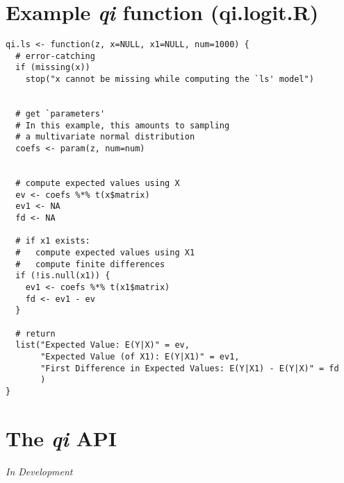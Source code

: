 \documentclass[10pt]{article}
\begin{document}
\pagebreak


\section{Example \emph{qi} function (qi.logit.R)}


\begin{verbatim}
qi.ls <- function(z, x=NULL, x1=NULL, num=1000) {
  # error-catching
  if (missing(x))
    stop("x cannot be missing while computing the `ls' model")


  # get `parameters'
  # In this example, this amounts to sampling
  # a multivariate normal distribution
  coefs <- param(z, num=num)


  # compute expected values using X
  ev <- coefs %*% t(x$matrix)
  ev1 <- NA
  fd <- NA
  
  # if x1 exists:
  #   compute expected values using X1
  #   compute finite differences
  if (!is.null(x1)) {
    ev1 <- coefs %*% t(x1$matrix)
    fd <- ev1 - ev
  }

  # return
  list("Expected Value: E(Y|X)" = ev,
       "Expected Value (of X1): E(Y|X1)" = ev1,
       "First Difference in Expected Values: E(Y|X1) - E(Y|X)" = fd
       )
}
\end{verbatim}

\pagebreak


\section{The \emph{qi} API}
\emph{In Development}
\end{document}
